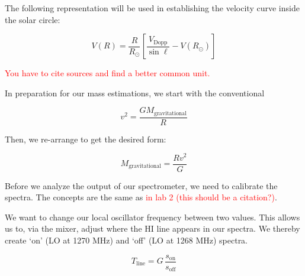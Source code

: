 \documentclass[12pt]{article}
\begin{document}
The following representation will be used in establishing the velocity curve inside the solar circle:

\begin{equation} \label{eq:vel_curve}
V(R) = \frac{R}{R_\odot} \left[ \frac{V_\text{Dopp}}{\sin \ell} - V(R_\odot) \right] 
\end{equation}





\textcolor{red}{You have to cite sources and find a better common unit.}

In preparation for our mass estimations, we start with the conventional

\begin{equation}
v^2 = \frac{G M_\text{gravitational}}{R} 
\end{equation}

Then, we re-arrange to get the desired form:

\begin{equation} \label{eq:mass}
M_\text{gravitational} = \frac{R v^2}{G} 
\end{equation}


Before we analyze the output of our spectrometer, we need to calibrate the spectra. The concepts are the same as \textcolor{red}{in lab 2 (this should be a citation?)}.

We want to change our local oscillator frequency between two values. This allows us to, via the mixer, adjust where the HI line appears in our spectra. We thereby create `on' (LO at 1270 MHz) and `off' (LO at 1268 MHz) spectra.

\begin{equation} \label{eq:line_shape}
T_\text{line} = G \, \frac{s_\text{on}}{s_\text{off}}
\end{equation}
\end{document}
